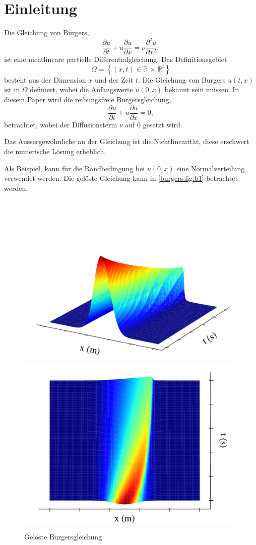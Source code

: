 %
%
\section{Einleitung \label{burgers:section:einleitung}}

	Die Gleichung von Burgers,
	\begin{equation}
		  \frac {\partial u}{\partial t}+u{\frac {\partial u}{\partial x}}=\nu {\frac {\partial ^{2}u}{\partial x^{2}}},
		  \label{burgers:eq_burgers}
	\end{equation}
	ist eine nichtlineare partielle Differentialgleichung.
	Das Definitionsgebiet
	\begin{equation}
		\Omega = \left \{ (x,t) \in  \mathbb{R} \, \times \,  \mathbb{R}^t \right \}
	\end{equation}
	besteht aus der Dimension $x$ und der Zeit $t$.
	Die Gleichung von Burgers $u(t,x)$ ist in $\Omega$ definiert, wobei die Anfangswerte $u(0,x)$ bekannt sein müssen.
	In diesem Paper wird die reibungsfreie Burgersgleichung,
	\begin{equation}
		\frac {\partial u}{\partial t}+u{\frac {\partial u}{\partial x}}=0,
		\label{burgers:eq_invisid_burgers}
	\end{equation}
	betrachtet, wobei der Diffusionsterm $\nu$ auf 0 gesetzt wird.


	Das Aussergewöhnliche an der Gleichung ist die Nichtlinearität, diese erschwert die numerische L\"osung erheblich.

	Als Beispiel, kann f\"ur die Randbedingung bei $u(0,x)$ eine Normalverteilung verwendet werden.
	Die gel\"oste Gleichung kann in \autoref{burgers:fig:b1} betrachtet werden.

	    \begin{figure}
		\centering
		\includegraphics[width=.49\textwidth]{papers/burgers/BurgersEquation/images/Implicit_front.pdf}
		\includegraphics[width=.49\textwidth]{papers/burgers/BurgersEquation/images/Implicit_top.pdf}
		\caption{Gel\"oste Burgersgleichung}
		\label{burgers:fig:b1}
		\end{figure}


